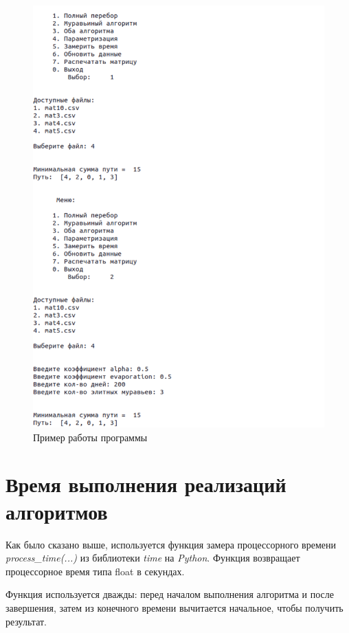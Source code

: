 \begin{figure}[h!]
	\centering
	\includegraphics[width=0.95\linewidth]{img/example}
	\caption{Пример работы программы}
	\label{fig:example}
\end{figure}
\clearpage

\section{Время выполнения реализаций алгоритмов}

Как было сказано выше, используется функция замера процессорного времени  \textit{process\_time(...)} из библиотеки \textit{time} на \textit{Python}. Функция возвращает процессорное время типа float в секундах.

Функция используется дважды: перед началом выполнения алгоритма и после завершения, затем из конечного времени вычитается начальное, чтобы получить результат.

